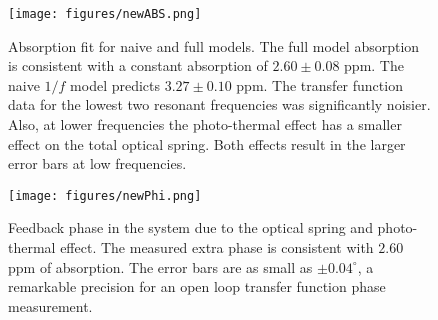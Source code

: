 \begin{figure}[htb]%
\texttt{[image: figures/newABS.png]}%
\caption{Absorption fit for naive and full models. The full model absorption is consistent with a constant absorption of  $2.60\pm0.08$ ppm. The naive $1/f$ model predicts $3.27\pm0.10$ ppm. The transfer function data for the lowest two resonant frequencies was significantly noisier. Also, at lower frequencies the photo-thermal  effect has a smaller effect on the total optical spring. Both effects result in the larger error bars at low frequencies.}
\label{fig:abs}%
\end{figure}

\begin{figure}[htb]%
\texttt{[image: figures/newPhi.png]}%
\caption{Feedback phase in the system due to the optical spring and photo-thermal effect. The measured extra phase is consistent with $2.60$ ppm of absorption. The error bars are as small as $\pm 0.04^{\circ}$, a remarkable precision for an open loop transfer function phase measurement.
}
\label{fig:phi}%
\end{figure}




